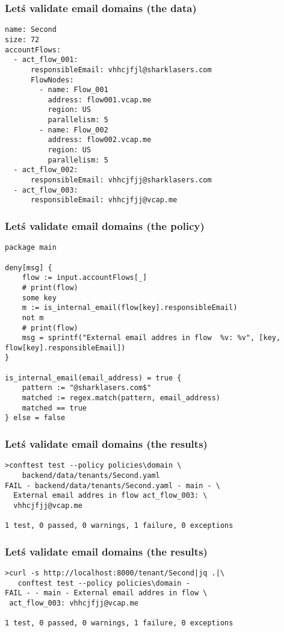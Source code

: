 \documentclass{beamer}
\begin{document}
\begin{frame}[fragile]
\frametitle{Let\'s validate email domains (the data)}
\begin{verbatim}
name: Second
size: 72
accountFlows:
  - act_flow_001: 
      responsibleEmail: vhhcjfjl@sharklasers.com
      FlowNodes:
        - name: Flow_001
          address: flow001.vcap.me
          region: US
          parallelism: 5
        - name: Flow_002
          address: flow002.vcap.me
          region: US
          parallelism: 5
  - act_flow_002: 
      responsibleEmail: vhhcjfjj@sharklasers.com
  - act_flow_003:
      responsibleEmail: vhhcjfjj@vcap.me
\end{verbatim}
\end{frame}

\begin{frame}[fragile]
\frametitle{Let\'s validate email domains (the policy)}
\begin{verbatim}
package main

deny[msg] {
    flow := input.accountFlows[_]
    # print(flow)
    some key
    m := is_internal_email(flow[key].responsibleEmail)
    not m
    # print(flow)
    msg = sprintf("External email addres in flow  %v: %v", [key, flow[key].responsibleEmail])
}

is_internal_email(email_address) = true {
    pattern := "@sharklasers.com$"
    matched := regex.match(pattern, email_address)
    matched == true 
} else = false
\end{verbatim}
\end{frame}

\begin{frame}[fragile]
\frametitle{Let\'s validate email domains (the results)}
\begin{verbatim}
>conftest test --policy policies\domain \
    backend/data/tenants/Second.yaml
FAIL - backend/data/tenants/Second.yaml - main - \
  External email addres in flow act_flow_003: \
  vhhcjfjj@vcap.me

1 test, 0 passed, 0 warnings, 1 failure, 0 exceptions

\end{verbatim} 

\end{frame}

\begin{frame}[fragile]
\frametitle{Let\'s validate email domains (the results)}
\begin{verbatim}
>curl -s http://localhost:8000/tenant/Second|jq .|\ 
   conftest test --policy policies\domain -
FAIL - - main - External email addres in flow \
 act_flow_003: vhhcjfjj@vcap.me

1 test, 0 passed, 0 warnings, 1 failure, 0 exceptions

\end{verbatim} 

\end{frame}
\end{document}
